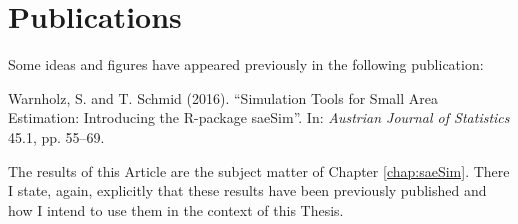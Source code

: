 

\chapter*{Publications} %

Some ideas and figures have appeared previously in the following publication:

\bigskip

\noindent Warnholz, S. and T. Schmid (2016). “Simulation Tools for Small Area
Estimation: Introducing the R-package saeSim”. In: \textit{Austrian Journal
of Statistics} 45.1, pp. 55–69.

\bigskip

\noindent The results of this Article are the subject matter of Chapter
\ref{chap:saeSim}. There I state, again, explicitly that these results have been
previously published and how I intend to use them in the context of this Thesis.

